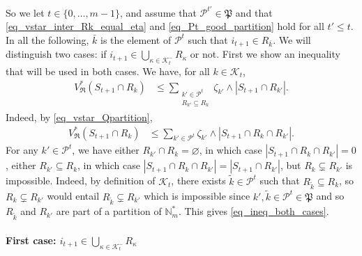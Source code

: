 \documentclass[
  11pt,
  a4paper,
]{article}
\let\oldparagraph\paragraph
\renewcommand{\paragraph}[1]{\oldparagraph{#1}\mbox{}}
\theoremstyle{plain}
\theoremstyle{definition}
\theoremstyle{plain}
\theoremstyle{definition}
\theoremstyle{plain}
\theoremstyle{remark}
\begin{document}
So we let \(t\in\{ 0,\dotsc,m-1\}\), and assume that
\(\mathcal{P}^{t'}\in\mathfrak P\) and that
\eqref{eq_vstar_inter_Rk_equal_eta} and \eqref{eq_Pt_good_partition}
hold for all \(t'\leq t\). In all the following, \(\bar k\) is the
element of \(\mathcal{P}^t\) such that \(i_{t+1}\in R_{\bar k}\). We
will distinguish two cases: if
\(i_{t+1}\in\bigcup_{\kappa\in\mathcal{K}^-_{t}}R_{\kappa}\) or not.
First we show an inequality that will be used in both cases. We have,
for all \(k\in\mathcal{K}_t\), \begin{align}
V^*_{\mathfrak{R}}(S_{t+1}\cap R_k)&\leq \sum_{\substack{k'\in\mathcal{P}^{t}\\R_{k'}\subseteq R_k}} \zeta_{k'}\wedge |S_{t+1}\cap R_{k'}|.\label{eq_ineq_both_cases}
\end{align} Indeed, by \eqref{eq_vstar_Qpartition}, \begin{align*}
V^*_{\mathfrak{R}}(S_{t+1}\cap R_k)&\leq  \sum_{k'\in\mathcal{P}^{t}} \zeta_{k'}\wedge |S_{t+1}\cap R_k \cap R_{k'}|.
\end{align*} For any \(k'\in\mathcal{P}^{t}\), we have either
\(R_{k'}\cap R_k=\varnothing\), in which case
\(|S_{t+1}\cap R_k \cap R_{k'}|=0\), either \(R_{k'}\subseteq R_k\), in
which case \(|S_{t+1}\cap R_k \cap R_{k'}|=|S_{t+1} \cap R_{k'}|\), but
\(R_{k}\subsetneq R_{k'}\) is impossible. Indeed, by definition of
\(\mathcal{K}_t\), there exists \(\tilde k\in \mathcal{P}^t\) such that
\(R_{\tilde k}\subseteq R_k\), so \(R_{k}\subsetneq R_{k'}\) would
entail \(R_{\tilde k}\subsetneq R_{k'}\) which is impossible since
\(k', \tilde k\in \mathcal{P}^t\in\mathfrak P\) and so \(R_{\tilde k}\)
and \(R_{k'}\) are part of a partition of \(\mathbb{N}_m^*\). This gives
\eqref{eq_ineq_both_cases}.

\paragraph{\texorpdfstring{First case:
\(i_{t+1}\in\bigcup_{\kappa\in\mathcal{K}^-_{t}}R_{\kappa}\)}{First case: i\_\{t+1\}\textbackslash in\textbackslash bigcup\_\{\textbackslash kappa\textbackslash in\textbackslash mathcal\{K\}\^{}-\_\{t\}\}R\_\{\textbackslash kappa\}}}\label{first-case-i_t1inbigcup_kappainmathcalk-_tr_kappa}
\end{document}

